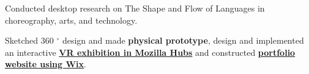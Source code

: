 



\newpage
{}
\vspace{-1.0mm}
\resumeItemListStart
\item Conducted desktop research on The Shape and Flow of Languages in choreography, arts, and technology.
\item Sketched 360 $ ^\circ $ design and made \textbf{physical prototype}, design and implemented an interactive \href{https://hubs.mozilla.com/HUwkA6r/sturdy-experienced-exploration}{\textbf{VR exhibition in Mozilla Hubs}} and constructed \href{https://yangziqi0605.wixsite.com/shape-flow-language}{\textbf{portfolio website using Wix}}.
\resumeItemListEnd
    \vspace{-1.0mm}

